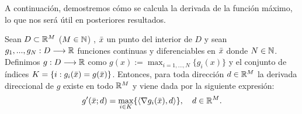 	A continuación, demostremos cómo se calcula la derivada de la función máximo, lo que nos será útil en posteriores resultados.
	\begin{proposicionBox}\label{dirDeriv}
		Sean $ D \subset \mathbb{R}^M$ ($ M \in \mathbb{N} $) , $ \bar{x} $ un punto del interior de $ D $ y sean $ g_1, ..., g_N : D \longrightarrow \mathbb{R} $  funciones continuas y diferenciables en $ \bar{x} $ donde $ N \in \mathbb{N} $. Definimos $ g:D \longrightarrow \mathbb{R} $ como $ g(x):=\max_{i=1,...,N}\{g_i(x)\} $ y el conjunto de índices $ K = \lbrace  i : g_i(\bar{x}) =  g(\bar{x}) \rbrace $. Entonces, para toda dirección $ d \in \mathbb{R}^M $ la derivada direccional de $ g $ existe en todo $ \mathbb{R}^M $ y viene dada por la siguiente expresión:
		\begin{equation}
			g'(\bar{x};d) = \max_{i \in K}\{ \langle \nabla g_i(\bar{x}), d \rangle\}, \quad d\in\mathbb{R}^M.
		\end{equation}
	\end{proposicionBox}
